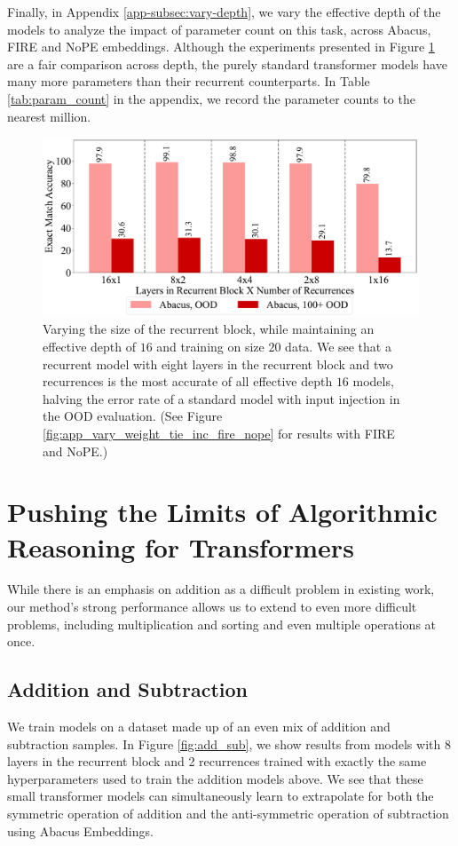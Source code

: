 \documentclass{article}
\begin{document}
Finally, in Appendix \ref{app-subsec:vary-depth}, we vary the effective depth of the models to analyze the impact of parameter count on this task, across Abacus, FIRE and NoPE embeddings.
Although the experiments presented in Figure \ref{fig:add_vary_weight_tie} are a fair comparison across depth, the purely standard transformer models have many more parameters than their recurrent counterparts.
In Table \ref{tab:param_count} in the appendix, we record the parameter counts to the nearest million.

\begin{figure}[ht!]
    \centering
    \includegraphics[width=\textwidth]{Figures/plot_four_recycle_only_2_bars.pdf}
    \caption{
    Varying the size of the recurrent block, while maintaining an effective depth of \(16\) and training on size \(20\) data. 
    We see that a recurrent model with eight layers in the recurrent block and two recurrences is the most accurate of all effective depth \(16\) models, halving the error rate of a standard model with input injection in the OOD evaluation. (See Figure \ref{fig:app_vary_weight_tie_inc_fire_nope} for results with FIRE and NoPE.)
    }
    \label{fig:add_vary_weight_tie}
\end{figure}


\section{Pushing the Limits of Algorithmic Reasoning for Transformers}

While there is an emphasis on addition as a difficult problem in existing work, our method's strong performance allows us to extend to even more difficult problems, including multiplication and sorting and even multiple operations at once.

\subsection{Addition and Subtraction}
We train models on a dataset made up of an even mix of addition and subtraction samples.
In Figure \ref{fig:add_sub}, we show results from models with 8 layers in the recurrent block and 2 recurrences trained with exactly the same hyperparameters used to train the addition models above.
We see that these small transformer models can simultaneously learn to extrapolate for both the symmetric operation of addition and the anti-symmetric operation of subtraction using Abacus Embeddings.
\end{document}
